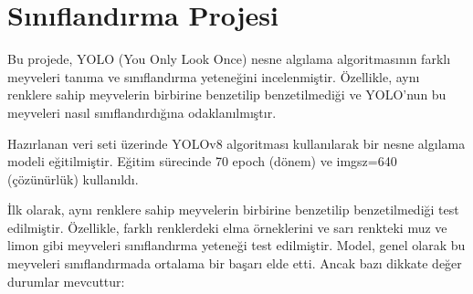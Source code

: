 \documentclass[11pt,a4paper]{report}
\begin{document}
    \section{Sınıflandırma Projesi}
    
    Bu projede, YOLO (You Only Look Once) nesne algılama algoritmasının farklı meyveleri tanıma ve sınıflandırma yeteneğini incelenmiştir. Özellikle, aynı renklere sahip meyvelerin birbirine benzetilip benzetilmediği ve YOLO'nun bu meyveleri nasıl sınıflandırdığına odaklanılmıştır.
    
    Hazırlanan veri seti üzerinde YOLOv8 algoritması kullanılarak bir nesne algılama modeli eğitilmiştir. Eğitim sürecinde 70 epoch (dönem) ve imgsz=640 (çözünürlük) kullanıldı.
    
    İlk olarak, aynı renklere sahip meyvelerin birbirine benzetilip benzetilmediği test edilmiştir. Özellikle, farklı renklerdeki elma örneklerini ve sarı renkteki muz ve limon gibi meyveleri sınıflandırma yeteneği test edilmiştir. Model, genel olarak bu meyveleri sınıflandırmada ortalama bir başarı elde etti. Ancak bazı dikkate değer durumlar mevcuttur:
    \clearpage
    
    
    
\end{document}
